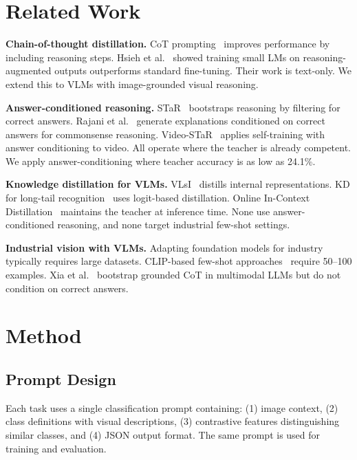 \documentclass[11pt]{article}
\begin{document}
\section{Related Work}
\label{sec:related}

\textbf{Chain-of-thought distillation.} CoT prompting~\cite{wei2022chain} improves performance by including reasoning steps. Hsieh et al.~\cite{hsieh2023distilling} showed training small LMs on reasoning-augmented outputs outperforms standard fine-tuning. Their work is text-only. We extend this to VLMs with image-grounded visual reasoning.

\textbf{Answer-conditioned reasoning.} STaR~\cite{zelikman2022star} bootstraps reasoning by filtering for correct answers. Rajani et al.~\cite{rajani2019explain} generate explanations conditioned on correct answers for commonsense reasoning. Video-STaR~\cite{zohar2025videostar} applies self-training with answer conditioning to video. All operate where the teacher is already competent. We apply answer-conditioning where teacher accuracy is as low as 24.1\%.

\textbf{Knowledge distillation for VLMs.} VLsI~\cite{vlsi2024verbalized} distills internal representations. KD for long-tail recognition~\cite{kd2024longtail} uses logit-based distillation. Online In-Context Distillation~\cite{online2025incontext} maintains the teacher at inference time. None use answer-conditioned reasoning, and none target industrial few-shot settings.

\textbf{Industrial vision with VLMs.} Adapting foundation models for industry~\cite{adapting2024industry} typically requires large datasets. CLIP-based few-shot approaches~\cite{clip2025fewshot} require 50--100 examples. Xia et al.~\cite{xia2025bootstrapping} bootstrap grounded CoT in multimodal LLMs but do not condition on correct answers.


\section{Method}
\label{sec:method}

\subsection{Prompt Design}

Each task uses a single classification prompt containing: (1) image context, (2) class definitions with visual descriptions, (3) contrastive features distinguishing similar classes, and (4) JSON output format. The same prompt is used for training and evaluation.
\end{document}
